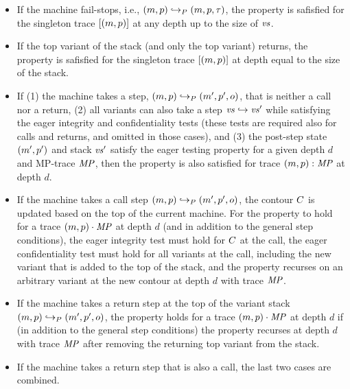 \documentclass[acmsmall,review,anonymous]{acmart}\settopmatter{printfolios=true,printccs=false,printacmref=false}
\begin{document}
  \begin{itemize}

  \item If the machine fail-stops, i.e.,
    $(m, p) \hookrightarrow_P (m, p, \tau)$,
    the property is safisfied for the singleton trace $[(m, p)]$ at any
    depth up to the size of $\mathit{vs}$.

  \item If the top variant of the stack (and only the top variant) returns,
    the property is safisfied for the singleton trace $[(m, p)]$ at depth
    equal to the size of the stack. 

  \item If (1) the machine takes a step,
    $(m, p) \hookrightarrow_P (m', p', o)$,
    that is neither a call nor a return, (2) all
    variants can also take a step $\mathit{vs} \hookrightarrow \mathit{vs}'$ 
    while satisfying the eager integrity and confidentiality tests 
    (these tests are required also for calls and returns, and omitted in those cases),
    and (3) the post-step state $(m', p')$ and stack $\mathit{vs}'$ satisfy the eager testing property
    for a given depth $d$  and MP-trace $\mathit{MP}$,
    then the property is also satisfied for trace $(m, p) : \mathit{MP}$
    at depth $d$.

  \item If the machine takes a call step
    $(m, p) \hookrightarrow_P (m', p', o)$,
    the contour $C$ is updated based on the top of the current machine.
    For the property to hold for a trace $(m, p) \cdot \mathit{MP}$ at depth $d$
    (and in addition to the general step conditions),
    the eager integrity test must hold for $C$ at the call,
    the eager confidentiality test must hold for all variants at the call,
    including the new variant that is added to the top of the stack,
    and the property recurses on an arbitrary variant at the new contour
    at depth $d$ with trace $\mathit{MP}$.

  \item If the machine takes a return step at the top of the variant stack
    $(m, p) \hookrightarrow_P (m', p', o)$,
    the property holds for a trace $(m, p) \cdot \mathit{MP}$ at depth $d$
    if (in addition to the general step conditions)
    the property recurses at depth $d$ with trace $\mathit{MP}$
    after removing the returning top variant from the stack.

  \item If the machine takes a return step that is also a call, the last two
    cases are combined.

  \end{itemize}
\end{document}
